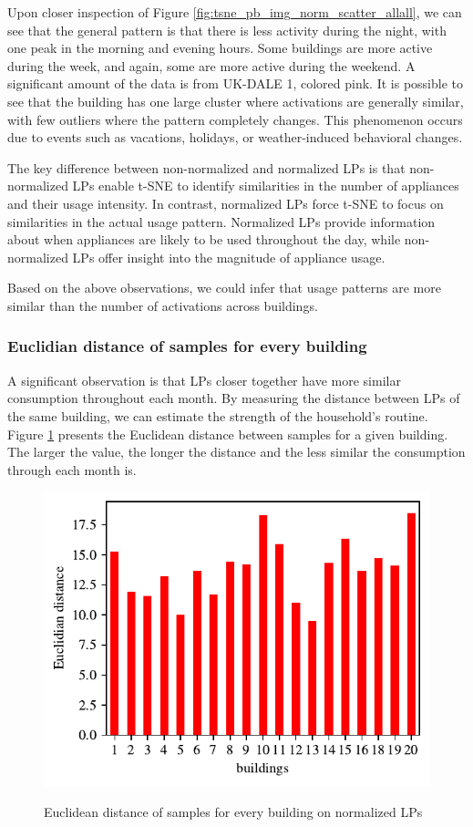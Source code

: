Upon closer inspection of Figure \ref{fig:tsne_pb_img_norm_scatter_allall}, we can see that the general pattern is that there is less activity during the night, with one peak in the morning and evening hours.
Some buildings are more active during the week, and again, some are more active during the weekend.
A significant amount of the data is from UK-DALE 1, colored pink.
It is possible to see that the building has one large cluster where activations are generally similar, with few outliers where the pattern completely changes.
This phenomenon occurs due to events such as vacations, holidays, or weather-induced behavioral changes.

The key difference between non-normalized and normalized LPs is that non-normalized LPs enable t-SNE to identify similarities in the number of appliances and their usage intensity.
In contrast, normalized LPs force t-SNE to focus on similarities in the actual usage pattern.
Normalized LPs provide information about when appliances are likely to be used throughout the day, while non-normalized LPs offer insight into the magnitude of appliance usage.

Based on the above observations, we could infer that usage patterns are more similar than the number of activations across buildings.

\subsubsection{Euclidian distance of samples for every building}
\label{ssec:tsne_euclidian_distance}

A significant observation is that LPs closer together have more similar consumption throughout each month.
By measuring the distance between LPs of the same building, we can estimate the strength of the household's routine.
Figure \ref{fig:tsne_euclidian} presents the Euclidean distance between samples for a given building.
The larger the value, the longer the distance and the less similar the consumption through each month is.

\begin{figure}[H]
	\centering
	\caption{Euclidean distance of samples for every building on normalized LPs}
	\includegraphics[]{Figures/EC/CORR_TSNE/tnse_euclidian.pdf}
	\label{fig:tsne_euclidian}
\end{figure}

